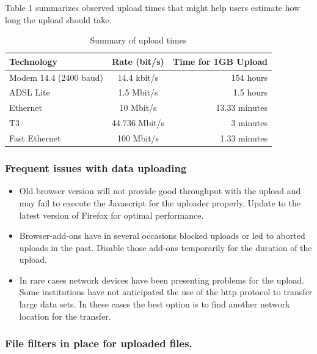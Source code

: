 \documentclass[12pt,fullpage]{report}
\begin{document}
Table 1 summarizes observed upload times that might help users estimate how long the upload should take.

\begin{table}
\begin{center}
\caption{Summary of upload times}
\begin{tabular}{ l | c | r }
Technology & Rate (bit/s) & Time for 1GB Upload\\
  \hline
Modem 14.4 (2400 baud) &	14.4 kbit/s&	154 hours\\
ADSL Lite & 1.5 Mbit/s &	1.5 hours\\
Ethernet&	10 Mbit/s & 13.33 minutes\\
T3 &	44.736 Mbit/s &~3 minutes\\
Fast Ethernet &	100 Mbit/s &1.33 minutes\\
  \hline
\end{tabular}
\end{center}
\end{table}

\subsubsection*{Frequent issues with data uploading}

\begin{itemize}
\item Old browser version will not provide good throughput with the upload and may fail to execute the Javascript for the uploader properly. Update to the latest version of Firefox for optimal performance.
\item Browser-add-ons have in several occasions blocked uploads or led to aborted uploads in the past. Disable those add-ons temporarily for the duration of the upload.
\item In rare cases network devices have been presenting problems for the upload. Some institutions have not anticipated the use of the http protocol to transfer large data sets. In these cases the best option is to find another network location for the transfer.
\end{itemize}


\subsubsection*{File filters in place for uploaded files.}
\end{document}
